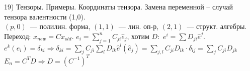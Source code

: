 19) Тензоры. Примеры. Координаты тензора. Замена переменной – случай тензора валентности (1,0).\\
$(p,0)$~--- полилин. форма, $(1, 1)$~--- лин. оп-р, $(2, 1)$~--- структ. алгебры. Переход: $x_{new} = Cx_{old}$. $e_i=\sum_{j=1}^nC_{ji}\hat{e}_j$, хотим $D:$ $e^i=\sum D_{ji}\hat{e}^j$. $e^k(e_i)=\delta_{ki}\Rightarrow \delta_{ki}=\sum_{j}C_{ji} \sum_{l}D_{lk}\hat{e}^l(\hat{e}_j)=\sum_{j,l}C_{ji}D_{lk}\cdot\delta_{lj}=\sum_{j}C_{ji}D_{jk}$ $E_n = C^TD\Rightarrow D = (C^{-1})^T$
